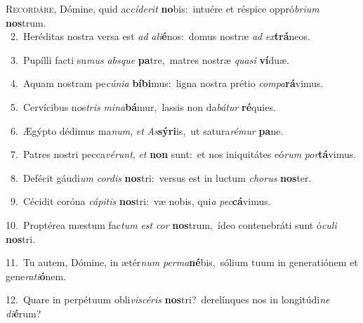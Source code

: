 \lettrine{\initial\textcolor{\initialcolor}{R}}{ecordáre,} Dómine, quid ac\-\textit{cí}\-\textit{de}\textit{rit} \textbf{no}\-bis:~\star intuére et réspice oppró\-\textit{bri}\-\textit{um} \textbf{nos}\-trum.\\
{\numbfont\textcolor{\numbcolor}{~2.}}~Heréditas nostra versa est \textit{ad} \textit{a}\-\textit{li}\textbf{é}nos:~\star domus nostræ \textit{ad} \textit{ex}\-\textbf{trá}neos.\par
{\numbfont\textcolor{\numbcolor}{~3.}}~Pupílli facti su\textit{mus} \textit{abs}\-\textit{que} \textbf{pa}\-tre,~\star matres nostræ \textit{qua}\-\textit{si} \textbf{ví}\-duæ.\par
{\numbfont\textcolor{\numbcolor}{~4.}}~Aquam nostram pe\-\textit{cú}\-\textit{ni}\textit{a} \textbf{bí}\-\textbf{bi}mus:~\star ligna nostra prétio \textit{com}\-\textit{pa}\textbf{rá}vimus.\par
{\numbfont\textcolor{\numbcolor}{~5.}}~Cervícibus nos\textit{tris} \textit{mi}\-\textit{na}\textbf{bá}mur,~\star lassis non da\-\textit{bá}\-\textit{tur} \textbf{ré}\-quies.\par
{\numbfont\textcolor{\numbcolor}{~6.}}~Ægýpto dédimus ma\-\textit{num}\-, \textit{et} \textit{As}\-\textbf{sý}\textbf{ri}is,~\star ut satura\-\textit{ré}\-\textit{mur} \textbf{pa}\-ne.\par
{\numbfont\textcolor{\numbcolor}{~7.}}~Patres nostri pecca\-\textit{vé}\-\textit{runt}, \textit{et} \textbf{non} sunt:~\star et nos iniquitátes eó\textit{rum} \textit{por}\-\textbf{tá}vimus.\par
{\numbfont\textcolor{\numbcolor}{~8.}}~Defécit gáudi\textit{um} \textit{cor}\-\textit{dis} \textbf{nos}\-tri:~\star versus est in luctum \textit{cho}\-\textit{rus} \textbf{nos}\-ter.\par
{\numbfont\textcolor{\numbcolor}{~9.}}~Cécidit coróna \textit{cá}\-\textit{pi}\textit{tis} \textbf{nos}\-tri:~\star væ nobis, qui\textit{a} \textit{pec}\-\textbf{cá}vimus.\par
{\numbfont\textcolor{\numbcolor}{10.}}~Proptérea mæstum fac\textit{tum} \textit{est} \textit{cor} \textbf{nos}\-trum,~\star ídeo contenebráti sunt ó\-\textit{cu}\-\textit{li} \textbf{nos}\-tri.\par
{\numbfont\textcolor{\numbcolor}{11.}}~Tu autem, Dómine, in ætér\textit{num} \textit{per}\-\textit{ma}\textbf{né}bis,~\star sólium tuum in generatiónem et gene\-\textit{ra}\-\textit{ti}\textbf{ó}nem.\par
{\numbfont\textcolor{\numbcolor}{12.}}~Quare in perpétuum obli\-\textit{vi}\-\textit{scé}\textit{ris} \textbf{nos}\-tri?~\star derelínques nos in longitúdi\textit{ne} \textit{di}\-\textbf{é}rum?\par
